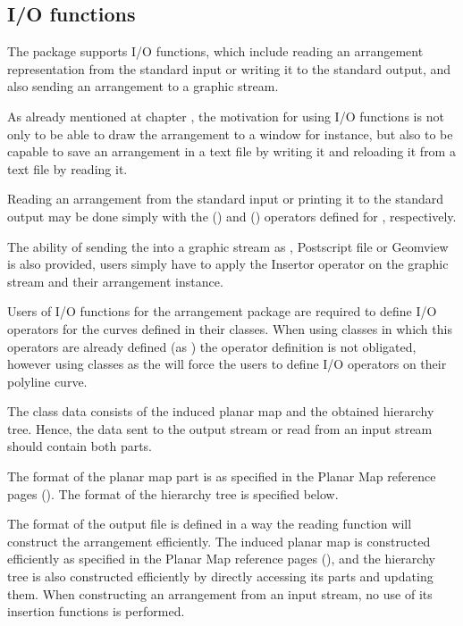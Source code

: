 \begin{ccAdvanced}
\subsection{I/O functions}
The  package supports I/O functions, which include reading 
an arrangement representation from 
the standard input or writing it to the standard output, 
and also sending an arrangement to a graphic stream.

As already mentioned at chapter , the motivation for 
using I/O functions is not only to be able to draw the arrangement 
to a window for instance, but also to be capable to save an arrangement 
in a text file by writing it and reloading it from a text file by reading it. 
 
Reading an arrangement from the standard input or printing it to the
standard output may be done simply with the  (\ccc{ >>
}) and  (\ccc{ << }) operators defined for
, respectively. 


The ability of sending the  
into a graphic stream as , Postscript file or
Geomview is also provided, users simply have to apply the Insertor
operator on the graphic stream and their arrangement instance.

Users of I/O functions for the arrangement package are required to define I/O 
operators for the curves defined in their  classes. 
When using  classes in which this operators are already defined 
(as ) the operator definition is not obligated, 
however using  classes as the  will force 
the users to define I/O operators on their polyline curve.

The  class data consists of the induced planar map and the 
obtained hierarchy tree. Hence, the data sent to the output stream or 
read from an input stream should contain both parts. 

The format of the planar map part is as specified in the Planar Map 
reference pages (). 
The format of the hierarchy tree is specified below.

The format of the output file is defined in a way the reading function 
will construct the arrangement efficiently. 
The induced planar map is constructed efficiently as specified in the Planar 
Map reference pages (), and the hierarchy tree is also 
constructed efficiently by directly accessing its parts and updating them. 
When constructing an arrangement from an input stream, no use of its 
insertion functions is performed.
 

\end{ccAdvanced}
